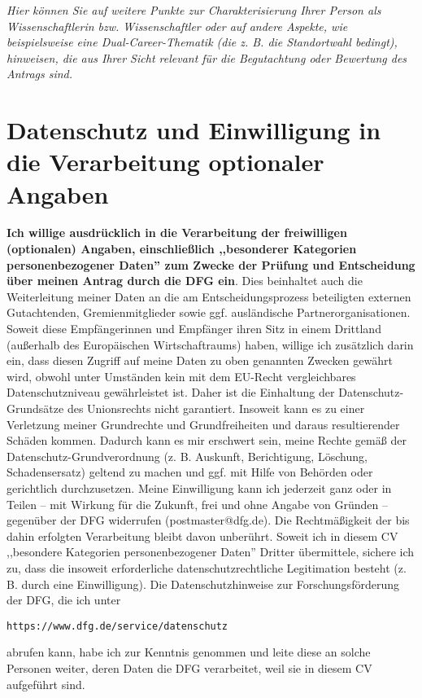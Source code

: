 \documentclass[a4paper,11pt]{article}
\begin{document}
\emph{Hier können Sie auf weitere Punkte zur Charakterisierung Ihrer Person als Wissenschaftlerin bzw. Wissenschaftler oder auf andere Aspekte, wie beispielsweise eine Dual-Career-Thematik (die z.  B. die Standortwahl bedingt), hinweisen, die aus Ihrer Sicht relevant für die Begutachtung oder Bewertung des Antrags sind.}

\section*{Datenschutz und Einwilligung in die Verarbeitung optionaler Angaben}
\footnotesize

\noindent
\textbf{Ich willige ausdrücklich in die Verarbeitung der freiwilligen
(optionalen) Angaben, einschließlich ,,besonderer Kategorien
personenbezogener Daten'' zum Zwecke der Prüfung und Entscheidung über
meinen Antrag durch die DFG ein}.
Dies beinhaltet auch die
Weiterleitung meiner Daten an die am Entscheidungsprozess beteiligten
externen Gutachtenden, Gremienmitglieder sowie ggf. ausländische
Partnerorganisationen. Soweit diese Empfängerinnen und Empfänger ihren
Sitz in einem Drittland (außerhalb des Europäischen Wirtschaftraums)
haben, willige ich zusätzlich darin ein, dass diesen Zugriff auf meine
Daten zu oben genannten Zwecken gewährt wird, obwohl unter Umständen
kein mit dem EU-Recht vergleichbares Datenschutzniveau gewährleistet
ist. Daher ist die Einhaltung der Datenschutz-Grundsätze des
Unionsrechts nicht garantiert. Insoweit kann es zu einer Verletzung
meiner Grundrechte und Grundfreiheiten und daraus resultierender
Schäden kommen. Dadurch kann es mir erschwert sein, meine Rechte gemäß
der Datenschutz-Grundverordnung (z. B. Auskunft, Berichtigung,
Löschung, Schadensersatz) geltend zu machen und ggf. mit Hilfe von
Behörden oder gerichtlich durchzusetzen.
%
Meine Einwilligung kann ich jederzeit ganz oder in Teilen -- mit
Wirkung für die Zukunft, frei und ohne Angabe von Gründen -- gegenüber
der DFG widerrufen (postmaster@dfg.de). Die Rechtmäßigkeit der bis
dahin erfolgten Verarbeitung bleibt davon unberührt. Soweit ich in
diesem CV ,,besondere Kategorien personenbezogener Daten'' Dritter
übermittele, sichere ich zu, dass die insoweit erforderliche
datenschutzrechtliche Legitimation besteht (z. B. durch eine
Einwilligung).
Die Datenschutzhinweise zur Forschungsförderung der DFG, die ich unter
\begin{verbatim}
https://www.dfg.de/service/datenschutz
\end{verbatim}
abrufen kann, habe ich
zur Kenntnis genommen und leite diese an solche Personen weiter, deren
Daten die DFG verarbeitet, weil sie in diesem CV aufgeführt sind.
\end{document}
